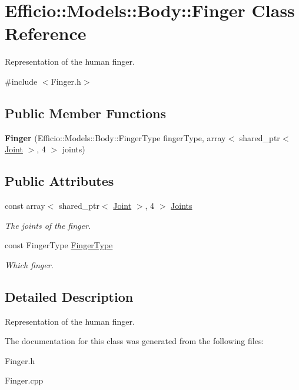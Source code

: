 \hypertarget{class_efficio_1_1_models_1_1_body_1_1_finger}{}\section{Efficio\+:\+:Models\+:\+:Body\+:\+:Finger Class Reference}
\label{class_efficio_1_1_models_1_1_body_1_1_finger}


Representation of the human finger.  




{\ttfamily \#include $<$Finger.\+h$>$}

\subsection*{Public Member Functions}
\begin{DoxyCompactItemize}
\item 
{\bfseries Finger} (Efficio\+::\+Models\+::\+Body\+::\+Finger\+Type finger\+Type, array$<$ shared\+\_\+ptr$<$ \hyperlink{class_efficio_1_1_models_1_1_body_1_1_joint}{Joint} $>$, 4 $>$ joints)\hypertarget{class_efficio_1_1_models_1_1_body_1_1_finger_a228494bff24a9874406ccd9da618eddc}{}\label{class_efficio_1_1_models_1_1_body_1_1_finger_a228494bff24a9874406ccd9da618eddc}

\end{DoxyCompactItemize}
\subsection*{Public Attributes}
\begin{DoxyCompactItemize}
\item 
const array$<$ shared\+\_\+ptr$<$ \hyperlink{class_efficio_1_1_models_1_1_body_1_1_joint}{Joint} $>$, 4 $>$ \hyperlink{class_efficio_1_1_models_1_1_body_1_1_finger_a9940e837998e1b042bce464f129e35d6}{Joints}\hypertarget{class_efficio_1_1_models_1_1_body_1_1_finger_a9940e837998e1b042bce464f129e35d6}{}\label{class_efficio_1_1_models_1_1_body_1_1_finger_a9940e837998e1b042bce464f129e35d6}

\begin{DoxyCompactList}\small\item\em The joints of the finger. \end{DoxyCompactList}\item 
const Finger\+Type \hyperlink{class_efficio_1_1_models_1_1_body_1_1_finger_a463468a5ef7c5023e5bb58fa7a916ad3}{Finger\+Type}\hypertarget{class_efficio_1_1_models_1_1_body_1_1_finger_a463468a5ef7c5023e5bb58fa7a916ad3}{}\label{class_efficio_1_1_models_1_1_body_1_1_finger_a463468a5ef7c5023e5bb58fa7a916ad3}

\begin{DoxyCompactList}\small\item\em Which finger. \end{DoxyCompactList}\end{DoxyCompactItemize}


\subsection{Detailed Description}
Representation of the human finger. 

The documentation for this class was generated from the following files\+:\begin{DoxyCompactItemize}
\item 
Finger.\+h\item 
Finger.\+cpp\end{DoxyCompactItemize}
